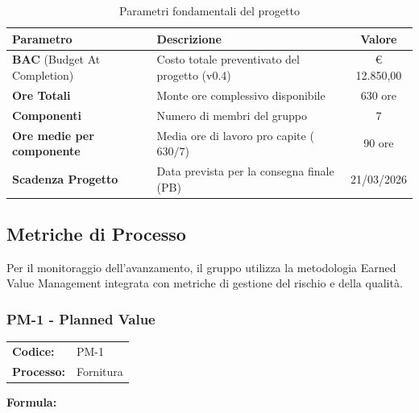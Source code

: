 \documentclass[a4paper,11pt,oneside]{scrartcl}
\begin{document}
\begin{table}[h!]
    \centering
    \renewcommand{\arraystretch}{1.3}
    \begin{tabularx}{\textwidth}{lXc}
        \toprule
        \textbf{Parametro}                  & \textbf{Descrizione}                                                       & \textbf{Valore} \\
        \midrule
        \textbf{BAC} (Budget At Completion) & Costo totale preventivato del progetto (v0.4)                              & € 12.850,00     \\
        \textbf{Ore Totali}                 & Monte ore complessivo disponibile                                          & 630 ore         \\
        \textbf{Componenti}                 & Numero di membri del gruppo                                                & 7               \\
        \textbf{Ore medie per componente}   & Media ore di lavoro pro capite ($630/7$)                                   & 90 ore          \\
        \textbf{Scadenza Progetto}          & Data prevista per la consegna finale (PB{\scriptsize\raisebox{-0.5ex}{G}}) & 21/03/2026      \\
        \bottomrule
    \end{tabularx}
    \caption{Parametri fondamentali del progetto}
\end{table}


\subsection{Metriche di Processo}
Per il monitoraggio dell'avanzamento, il gruppo utilizza la metodologia Earned Value Management{\scriptsize{}} integrata con metriche di gestione del rischio e della qualità.

\subsubsection{PM-1 - Planned Value}

\noindent
\begin{tabular}{@{}p{}p{}@{}}
    \textbf{Codice:}   & PM-1      \\
    \textbf{Processo:} & Fornitura \\
\end{tabular}

\vspace{0.3cm}
\noindent\textbf{Formula:}
\end{document}
